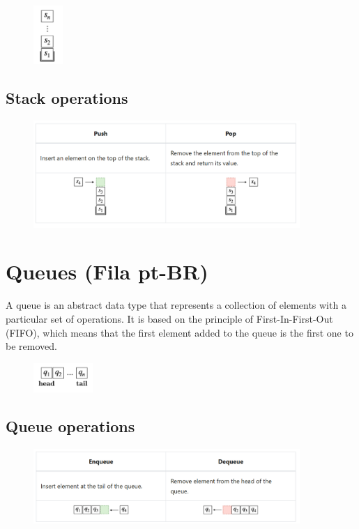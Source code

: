 \documentclass{article}
\begin{document}
\begin{figure}[!ht]
    \centering
    \includegraphics*[width=0.1\textwidth]{images/stack.png}
\end{figure}

\subsection{Stack operations}

\begin{figure}[!ht]
    \centering
    \includegraphics*[width=0.9\textwidth]{images/stack_operations.png}
\end{figure}

\section{Queues (Fila pt-BR)}

A queue is an abstract data type that represents a collection of elements with a particular set of operations. It is based on the principle of First-In-First-Out (FIFO), which means that the first element added to the queue is the first one to be removed.

\begin{figure}[!ht]
    \centering
    \includegraphics*[width=0.2\textwidth]{images/queue.png}
\end{figure}

\subsection{Queue operations}

\begin{figure}[!ht]
    \centering
    \includegraphics*[width=0.9\textwidth]{images/queue_operations.png}
\end{figure}

% 
\end{document}
